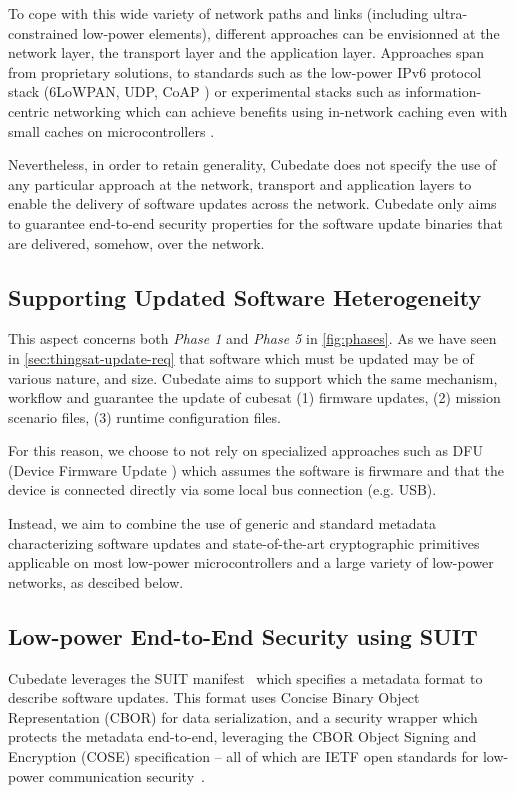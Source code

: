 To cope with this wide variety of network paths and links (including ultra-constrained low-power elements), different approaches can be envisionned at the network layer, the transport layer and the application layer. Approaches span from proprietary solutions, to standards such as the low-power IPv6 protocol stack (6LoWPAN, UDP, CoAP \cite{morabito2020ietf}) or experimental stacks such as information-centric networking which can achieve benefits using in-network caching even with small caches on microcontrollers \cite{hahm2017low}. 

Nevertheless, in order to retain generality, Cubedate does not specify the use of any particular approach at the network, transport and application layers to enable the delivery of software updates across the network.
Cubedate only aims to guarantee end-to-end security properties for the software update binaries that are delivered, somehow, over the network.

\subsection{Supporting Updated Software Heterogeneity}
This aspect concerns both \textit{Phase 1} and \textit{Phase 5} in \autoref{fig:phases}. 
As we have seen in \autoref{sec:thingsat-update-req} that software which must be updated may be of various nature, and size.
Cubedate aims to support which the same mechanism, workflow and guarantee the update of cubesat (1) firmware updates, (2) mission scenario files, (3) runtime configuration files.

For this reason, we choose to not rely on specialized approaches such as DFU (Device Firmware Update \cite{beningo2018dfu}) which assumes the software is firwmare and that the device is connected directly via some local bus connection (e.g. USB).

Instead, we aim to combine the use of generic and standard metadata characterizing software updates and state-of-the-art cryptographic primitives applicable on most low-power microcontrollers and a large variety of low-power networks, as descibed below.

\subsection{Low-power End-to-End Security using SUIT}

Cubedate leverages the SUIT manifest~\cite{suit-manifest} which specifies a metadata format to describe software updates. This format uses Concise Binary Object Representation (CBOR) for data serialization, and a security wrapper which protects the metadata end-to-end, leveraging the CBOR Object Signing and Encryption (COSE) specification -- all of which are IETF open standards for low-power communication security~\cite{tschofenig2019cyberphysical}.

